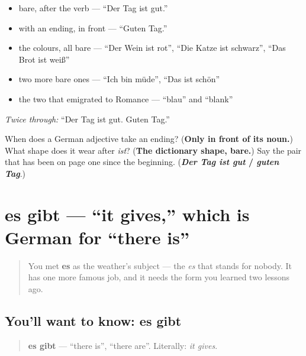 \begin{itemize}
\raggedright
  \item bare, after the verb — \textquotedblleft{}Der Tag ist gut.\textquotedblright{}
  \item with an ending, in front — \textquotedblleft{}Guten Tag.\textquotedblright{}
  \item the colours, all bare — \textquotedblleft{}Der Wein ist rot\textquotedblright{}, \textquotedblleft{}Die Katze ist schwarz\textquotedblright{}, \textquotedblleft{}Das Brot ist weiß\textquotedblright{}
  \item two more bare ones — \textquotedblleft{}Ich bin müde\textquotedblright{}, \textquotedblleft{}Das ist schön\textquotedblright{}
  \item the two that emigrated to Romance — \textquotedblleft{}blau\textquotedblright{} and \textquotedblleft{}blank\textquotedblright{}
\end{itemize}

\emph{Twice through:} \textquotedblleft{}Der Tag ist gut. Guten Tag.\textquotedblright{}

\begin{tcolorbox}[breakable,colback=teal!4,colframe=teal!35!black,title={Before you move on}]
When does a German adjective take an ending? (\textbf{Only in front of its noun.}) What shape does it wear after \emph{ist}? (\textbf{The dictionary shape, bare.}) Say the pair that has been on page one since the beginning. (\textbf{\emph{Der Tag ist gut} / \emph{guten Tag}}.)
\end{tcolorbox}
\section[es gibt]{es gibt — \textquotedblleft{}it gives,\textquotedblright{} which is German for \textquotedblleft{}there is\textquotedblright{}}

\label{lesson:GE-C34-es-gibt}



\begin{quote}
You met \textbf{es} as the weather's subject — the \emph{es} that stands for nobody. It has one more famous job, and it needs the form you learned two lessons ago.
\end{quote}

\subsection*{You'll want to know: es gibt}
\begin{quote}
\textbf{es gibt} — \textquotedblleft{}there is\textquotedblright{}, \textquotedblleft{}there are\textquotedblright{}. Literally: \emph{it gives}.
\end{quote}

